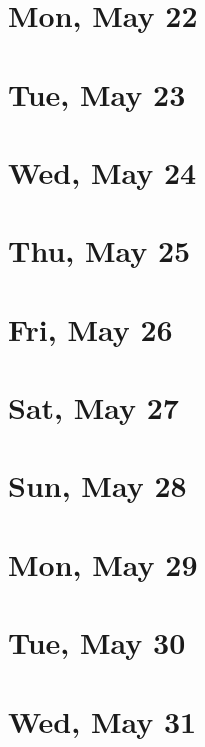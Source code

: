 	\section{Mon, May 22}
		
	\section{Tue, May 23}
		
	\section{Wed, May 24}
		
	\section{Thu, May 25}
		
	\section{Fri, May 26}
		
	\section{Sat, May 27}
		
	\section{Sun, May 28}
		
	\section{Mon, May 29}
		
	\section{Tue, May 30}
		
	\section{Wed, May 31}
		
